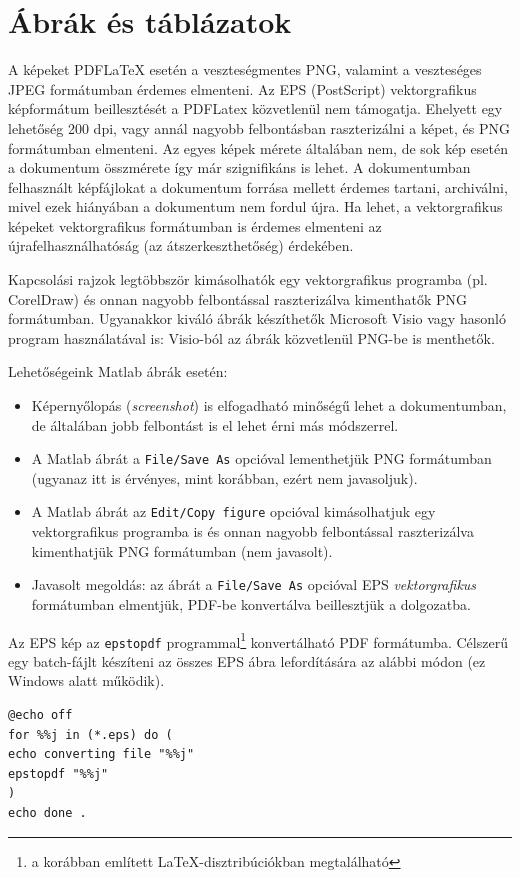 \section{Ábrák és táblázatok}
A képeket PDFLaTeX esetén a veszteségmentes PNG, valamint a veszteséges JPEG formátumban érdemes elmenteni. Az EPS (PostScript) vektorgrafikus képformátum beillesztését a PDFLatex közvetlenül nem támogatja. Ehelyett egy lehetőség 200 dpi, vagy annál nagyobb felbontásban raszterizálni a képet, és PNG formátumban elmenteni. Az egyes képek mérete általában nem, de sok kép esetén a dokumentum összmérete így már szignifikáns is lehet. A dokumentumban felhasznált képfájlokat a dokumentum forrása mellett érdemes tartani, archiválni, mivel ezek hiányában a dokumentum nem fordul újra. Ha lehet, a vektorgrafikus képeket vektorgrafikus formátumban is érdemes elmenteni az újrafelhasználhatóság (az átszerkeszthetőség) érdekében.

Kapcsolási rajzok legtöbbször kimásolhatók egy vektorgrafikus programba (pl. CorelDraw) és onnan nagyobb felbontással raszterizálva kimenthatők PNG formátumban. Ugyanakkor kiváló ábrák készíthetők Microsoft Visio vagy hasonló program használatával is: Visio-ból az ábrák közvetlenül PNG-be is menthetők.

Lehetőségeink Matlab ábrák esetén:
\begin{itemize}
	\item Képernyőlopás (\emph{screenshot}) is elfogadható minőségű lehet a dokumentumban, de általában jobb felbontást is el lehet érni más módszerrel.
	\item A Matlab ábrát a \verb+File/Save As+ opcióval lementhetjük PNG formátumban (ugyanaz itt is érvényes, mint korábban, ezért nem javasoljuk).
	\item A Matlab ábrát az \verb+Edit/Copy figure+ opcióval kimásolhatjuk egy vektorgrafikus programba is és onnan nagyobb felbontással raszterizálva kimenthatjük PNG formátumban (nem javasolt).
	\item Javasolt megoldás: az ábrát a \verb+File/Save As+ opcióval EPS \emph{vektorgrafikus} formátumban elmentjük, PDF-be konvertálva beillesztjük a dolgozatba.
\end{itemize}
Az EPS kép az \verb+epstopdf+ programmal\footnote{a korábban említett \LaTeX-disztribúciókban megtalálható} konvertálható PDF formátumba. Célszerű egy batch-fájlt készíteni az összes EPS ábra lefordítására az alábbi módon (ez Windows alatt működik).
\begin{lstlisting}[frame=single,float=!ht]
@echo off
for %%j in (*.eps) do (
echo converting file "%%j"
epstopdf "%%j"
)
echo done .
\end{lstlisting}

